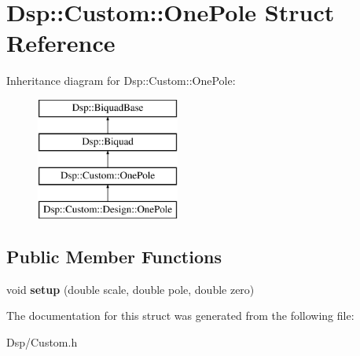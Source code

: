 \hypertarget{structDsp_1_1Custom_1_1OnePole}{\section{Dsp\-:\-:Custom\-:\-:One\-Pole Struct Reference}
\label{structDsp_1_1Custom_1_1OnePole}
}
Inheritance diagram for Dsp\-:\-:Custom\-:\-:One\-Pole\-:\begin{figure}[H]
\begin{center}
\leavevmode
\includegraphics[height=4.000000cm]{structDsp_1_1Custom_1_1OnePole}
\end{center}
\end{figure}
\subsection*{Public Member Functions}
\begin{DoxyCompactItemize}
\item 
\hypertarget{structDsp_1_1Custom_1_1OnePole_a92e1e1dca7ada57930e908460eb45421}{void {\bfseries setup} (double scale, double pole, double zero)}\label{structDsp_1_1Custom_1_1OnePole_a92e1e1dca7ada57930e908460eb45421}

\end{DoxyCompactItemize}


The documentation for this struct was generated from the following file\-:\begin{DoxyCompactItemize}
\item 
Dsp/Custom.\-h\end{DoxyCompactItemize}

